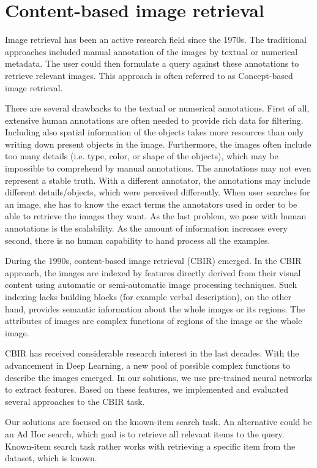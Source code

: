 \chapter{Content-based image retrieval}

Image retrieval has been an active research field since the 1970s. The traditional approaches included manual annotation of the images by textual or numerical metadata. The user could then formulate a query against these annotations to retrieve relevant images. This approach is often referred to as Concept-based image retrieval.

There are several drawbacks to the textual or numerical annotations. First of all, extensive human annotations are often needed to provide rich data for filtering. Including also spatial information of the objects takes more resources than only writing down present objects in the image. Furthermore, the images often include too many details (i.e. type, color, or shape of the objects), which may be impossible to comprehend by manual annotations.  The annotations may not even represent a stable truth. With a different annotator, the annotations may include different details/objects, which were perceived differently. When user searches for an image, she has to know the exact terms the annotators used in order to be able to retrieve the images they want. As the last problem, we pose with human annotations is the scalability. As the amount of information increases every second, there is no human capability to hand process all the examples.

During the 1990s, content-based image retrieval (CBIR) emerged. In the CBIR approach, the images are indexed by features directly derived from their visual content using automatic or semi-automatic image processing techniques. Such indexing lacks building blocks (for example verbal description), on the other hand, provides semantic information about the whole images or its regions. The attributes of images are complex functions of regions of the image or the whole image.

CBIR has received considerable research interest in the last decades. With the advancement in Deep Learning, a new pool of possible complex functions to describe the images emerged. In our solutions, we use pre-trained neural networks to extract features. Based on these features, we implemented and evaluated several approaches to the CBIR task.

Our solutions are focused on the known-item search task. An alternative could be an Ad Hoc search, which goal is to retrieve all relevant items to the query. Known-item search task rather works with retrieving a specific item from the dataset, which is known.

